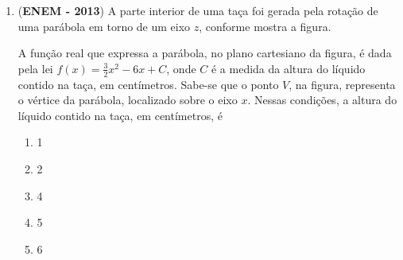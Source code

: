 {\begin{enumerate}
O gráfico abaixo indica a distância de frenagem \(d\), em metros, percorrida por um carro, em função de sua velocidade \(v\), em quilômetros por hora.

Admita que o freio desse carro seja acionado quando ele alcançar a velocidade de \(100\) km/h.

Calcule sua distância de frenagem, em metros.


\clearpage
\item (\textbf{ENEM - 2013}) A parte interior de uma taça foi gerada pela rotação de uma parábola em torno de um eixo \(z\), conforme mostra a figura.

\begin{figure}[H]
\centering

\end{figure}

A função real que expressa a parábola, no plano cartesiano da figura, é dada pela lei \(\displaystyle f(x)=\frac{3}{2}x^2-6x+C\), onde \(C\) é a medida da altura do líquido contido na taça, em centímetros. Sabe-se que o ponto \(V\), na figura, representa o vértice da parábola, localizado sobre o eixo \(x\).
Nessas condições, a altura do líquido contido na taça, em centímetros, é
\begin{enumerate}
\item 1
\item 2
\item 4
\item 5
\item 6
\end{enumerate}


\end{enumerate}}
